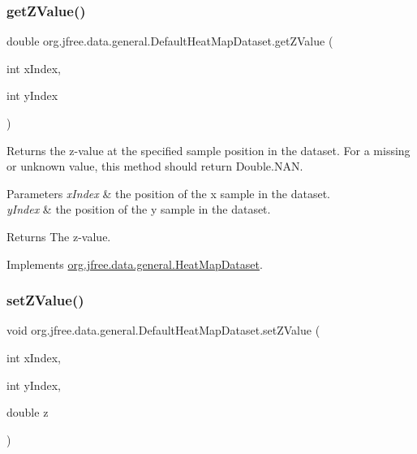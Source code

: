 \subsubsection{\texorpdfstring{get\+Z\+Value()}{getZValue()}}
{\footnotesize\ttfamily double org.\+jfree.\+data.\+general.\+Default\+Heat\+Map\+Dataset.\+get\+Z\+Value (\begin{DoxyParamCaption}\item[{int}]{x\+Index,  }\item[{int}]{y\+Index }\end{DoxyParamCaption})}

Returns the z-\/value at the specified sample position in the dataset. For a missing or unknown value, this method should return Double.\+N\+AN.


\begin{DoxyParams}{Parameters}
{\em x\+Index} & the position of the x sample in the dataset. \\
\hline
{\em y\+Index} & the position of the y sample in the dataset.\\
\hline
\end{DoxyParams}
\begin{DoxyReturn}{Returns}
The z-\/value. 
\end{DoxyReturn}


Implements \mbox{\hyperlink{interfaceorg_1_1jfree_1_1data_1_1general_1_1_heat_map_dataset_ad4c5c315a22d263edf0da447693fb0d7}{org.\+jfree.\+data.\+general.\+Heat\+Map\+Dataset}}.

\mbox{\label{classorg_1_1jfree_1_1data_1_1general_1_1_default_heat_map_dataset_ada1fbb28ef64cba5c3594f4f0e956f38}} 
\subsubsection{\texorpdfstring{set\+Z\+Value()}{setZValue()}\hspace{0.1cm}{\footnotesize\ttfamily [1/2]}}
{\footnotesize\ttfamily void org.\+jfree.\+data.\+general.\+Default\+Heat\+Map\+Dataset.\+set\+Z\+Value (\begin{DoxyParamCaption}\item[{int}]{x\+Index,  }\item[{int}]{y\+Index,  }\item[{double}]{z }\end{DoxyParamCaption})}

